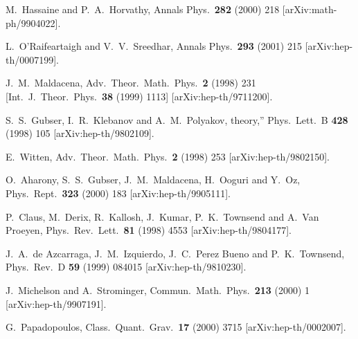 \documentclass[a4paper,12pt]{article}
\begin{document}
\begin{thebibliography}{99}
M.~Hassaine and P.~A.~Horvathy,
Annals Phys.\  {\bf 282} (2000) 218
[arXiv:math-ph/9904022].


L.~O'Raifeartaigh and V.~V.~Sreedhar,
Annals Phys.\  {\bf 293} (2001) 215
[arXiv:hep-th/0007199].


J.~M.~Maldacena,
Adv.\ Theor.\ Math.\ Phys.\  {\bf 2} (1998) 231
[Int.\ J.\ Theor.\ Phys.\  {\bf 38} (1999) 1113]
[arXiv:hep-th/9711200].


S.~S.~Gubser, I.~R.~Klebanov and A.~M.~Polyakov,
theory,''
Phys.\ Lett.\ B {\bf 428} (1998) 105
[arXiv:hep-th/9802109].

E.~Witten,
Adv.\ Theor.\ Math.\ Phys.\  {\bf 2} (1998) 253
[arXiv:hep-th/9802150].


O.~Aharony, S.~S.~Gubser, J.~M.~Maldacena, H.~Ooguri and
Y.~Oz,
Phys.\ Rept.\  {\bf 323} (2000) 183
[arXiv:hep-th/9905111].


P.~Claus, M.~Derix, R.~Kallosh, J.~Kumar, P.~K.~Townsend and
A.~Van Proeyen,
Phys.\ Rev.\ Lett.\  {\bf 81} (1998) 4553
[arXiv:hep-th/9804177].


J.~A.~de Azcarraga, J.~M.~Izquierdo, J.~C.~Perez Bueno and
P.~K.~Townsend,
Phys.\ Rev.\ D {\bf 59} (1999) 084015
[arXiv:hep-th/9810230].


J.~Michelson and A.~Strominger,
Commun.\ Math.\ Phys.\  {\bf 213} (2000) 1
[arXiv:hep-th/9907191].


G.~Papadopoulos,
Class.\ Quant.\ Grav.\  {\bf 17} (2000) 3715
[arXiv:hep-th/0002007].



\end{thebibliography}
\end{document}
